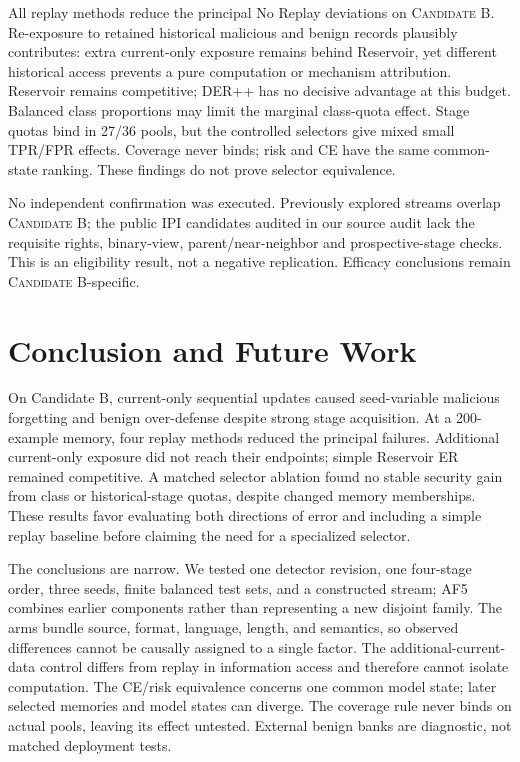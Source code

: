 \documentclass[conference]{IEEEtran}
\newcommand{\candb}{\textsc{Candidate B}}
\begin{document}
All replay methods reduce the principal No Replay deviations on \candb{}. Re-exposure to retained historical malicious and benign records plausibly contributes: extra current-only exposure remains behind Reservoir, yet different historical access prevents a pure computation or mechanism attribution. Reservoir remains competitive; DER++ has no decisive advantage at this budget. Balanced class proportions may limit the marginal class-quota effect. Stage quotas bind in 27/36 pools, but the controlled selectors give mixed small TPR/FPR effects. Coverage never binds; risk and CE have the same common-state ranking. These findings do not prove selector equivalence.

No independent confirmation was executed. Previously explored streams overlap \candb{}; the public IPI candidates audited in our source audit lack the requisite rights, binary-view, parent/near-neighbor and prospective-stage checks. This is an eligibility result, not a negative replication. Efficacy conclusions remain \candb{}-specific.

\section{Conclusion and Future Work}
On Candidate B, current-only sequential updates caused seed-variable malicious forgetting and benign over-defense despite strong stage acquisition. At a 200-example memory, four replay methods reduced the principal failures. Additional current-only exposure did not reach their endpoints; simple Reservoir ER remained competitive. A matched selector ablation found no stable security gain from class or historical-stage quotas, despite changed memory memberships. These results favor evaluating both directions of error and including a simple replay baseline before claiming the need for a specialized selector.

The conclusions are narrow. We tested one detector revision, one four-stage order, three seeds, finite balanced test sets, and a constructed stream; AF5 combines earlier components rather than representing a new disjoint family. The arms bundle source, format, language, length, and semantics, so observed differences cannot be causally assigned to a single factor. The additional-current-data control differs from replay in information access and therefore cannot isolate computation. The CE/risk equivalence concerns one common model state; later selected memories and model states can diverge. The coverage rule never binds on actual pools, leaving its effect untested. External benign banks are diagnostic, not matched deployment tests.
\end{document}
